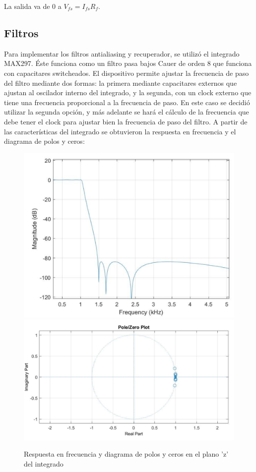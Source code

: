 \documentclass[assd_tp3_main.tex]{subfiles}
\begin{document}
La salida va de 0 a $V_{fs} = I_{fs}R_f$. 

\subsection{Filtros}
Para implementar los filtros antialiasing y recuperador, se utilizó el integrado MAX297.
Éste funciona como un filtro pasa bajos Cauer de orden 8 que funciona con capacitares switcheados. El dispositivo permite ajustar la frecuencia de paso del filtro
mediante dos formas: la primera mediante capacitares externos que ajustan al
oscilador interno del integrado, y la segunda, con un clock externo que tiene una
frecuencia proporcional a la frecuencia de paso.
En este caso se decidió utilizar la segunda opción, y más adelante se hará el cálculo
de la frecuencia que debe tener el clock para ajustar bien la frecuencia de paso del
filtro.
A partir de las características del integrado se obtuvieron la respuesta en frecuencia y el diagrama de polos y ceros:

\begin{figure}[H]
\begin{centering}
\includegraphics[scale=0.3]{images/ej1/rtafrec.png}
\includegraphics[scale=0.3]{images/ej1/pzmap.png}
\par\end{centering}
\caption{Respuesta en frecuencia y diagrama de polos y ceros en el plano 'z' del integrado}
\end{figure}
\end{document}
